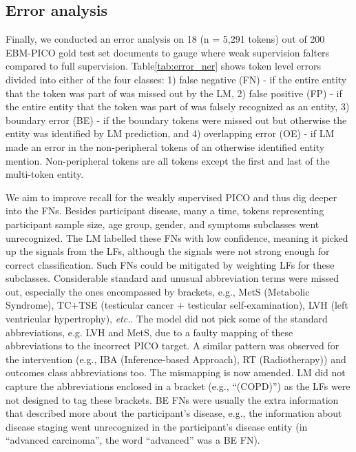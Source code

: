 \documentclass[10.7pt,]{article}
\begin{document}
\subsection{Error analysis}\label{error_an}
%
Finally, we conducted an error analysis on 18 (n = 5,291 tokens) out of 200 EBM-PICO gold test set documents to gauge where weak supervision falters compared to full supervision.
Table\ref{tab:error_ner} shows token level errors divided into either of the four classes: 1) false negative (FN) - if the entire entity that the token was part of was missed out by the LM, 2) false positive (FP) - if the entire entity that the token was part of was falsely recognized as an entity, 3) boundary error (BE) - if the boundary tokens were missed out but otherwise the entity was identified by LM prediction, and 4) overlapping error (OE) - if LM made an error in the non-peripheral tokens of an otherwise identified entity mention.
Non-peripheral tokens are all tokens except the first and last of the multi-token entity.

We aim to improve recall for the weakly supervised PICO and thus dig deeper into the FNs.
Besides participant disease, many a time, tokens representing participant sample size, age group, gender, and symptoms subclasses went unrecognized.
The LM labelled these FNs with low confidence, meaning it picked up the signals from the LFs, although the signals were not strong enough for correct classification. 
Such FNs could be mitigated by weighting LFs for these subclasses.
Considerable standard and unusual abbreviation terms were missed out, especially the ones encompassed by brackets, e.g., MetS (Metabolic Syndrome), TC+TSE (testicular cancer + testicular self-examination), LVH (left ventricular hypertrophy), \textit{etc.}.
The model did not pick some of the standard abbreviations, e.g. LVH and MetS, due to a faulty mapping of these abbreviations to the incorrect PICO target.
A similar pattern was observed for the intervention (e.g., IBA (Inference-based Approach), RT (Radiotherapy)) and outcomes class abbreviations too.
The mismapping is now amended.
LM did not capture the abbreviations enclosed in a bracket (e.g., ``(COPD)'') as the LFs were not designed to tag these brackets.
BE FNs were usually the extra information that described more about the participant's disease, e.g., the information about disease staging went unrecognized in the participant's disease entity (in ``advanced carcinoma'', the word ``advanced'' was a BE FN).
\end{document}
